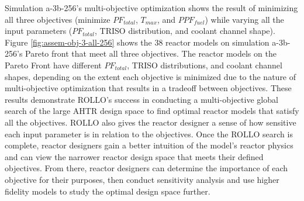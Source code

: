 Simulation a-3b-256's multi-objective optimization shows the result of minimizing all 
three objectives (minimize $PF_{total}$, $T_{max}$, and $PPF_{fuel}$) while varying 
all the input parameters ($PF_{total}$, TRISO distribution, and coolant channel shape).
Figure \ref{fig:assem-obj-3-all-256} shows the 38 reactor models on simulation 
a-3b-256's Pareto front that meet all three objectives. 
The reactor models on the Pareto Front have different $PF_{total}$, TRISO distributions, 
and coolant channel shapes, depending on the extent each objective is minimized due 
to the nature of multi-objective optimization that results in a tradeoff between 
objectives. 
These results demonstrate \gls{ROLLO}'s success in conducting a multi-objective global 
search of the large \gls{AHTR} design space to find optimal reactor models that satisfy 
all the objectives. 
\gls{ROLLO} also gives the reactor designer a sense of how sensitive 
each input parameter is in relation to the objectives. 
Once the \gls{ROLLO} search is complete, reactor designers gain a better intuition of 
the model's reactor physics and can view the narrower reactor design space that meets 
their defined objectives. 
From there, reactor designers can determine the importance of each objective for 
their purposes, then conduct sensitivity analysis and use higher fidelity models to 
study the optimal design space further.
